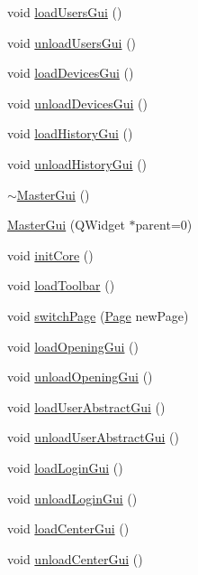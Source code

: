 \begin{DoxyCompactItemize}
void \hyperlink{class_master_gui_a1f18335831f755fa60cc7b2dfbb5f6f6}{load\-Users\-Gui} ()
\item 
void \hyperlink{class_master_gui_af822ec52a33f23f476684714aacd9a4c}{unload\-Users\-Gui} ()
\item 
void \hyperlink{class_master_gui_a9477c85af4420ec5c8d0c5ceeb4df9de}{load\-Devices\-Gui} ()
\item 
void \hyperlink{class_master_gui_abeb5b8861736263521757754dff9d5d9}{unload\-Devices\-Gui} ()
\item 
void \hyperlink{class_master_gui_aae738557e6153a8584468f8af3a5f2d8}{load\-History\-Gui} ()
\item 
void \hyperlink{class_master_gui_a0e0b8c7b714b89df916742664f7c338b}{unload\-History\-Gui} ()
\item 
\hyperlink{class_master_gui_a4eeae08177c54aba4aad160fc1c5efc6}{$\sim$\-Master\-Gui} ()
\item 
\hyperlink{class_master_gui_a661a3bdba67b40b286cc5d03f102a5fa}{Master\-Gui} (Q\-Widget $\ast$parent=0)
\item 
void \hyperlink{class_master_gui_a7f49d299b2139b827b29e7090c007b93}{init\-Core} ()
\item 
void \hyperlink{class_master_gui_acbb009f39bcb1ccc3829cbb1849887f7}{load\-Toolbar} ()
\item 
void \hyperlink{class_master_gui_a72a87c03cd2c7be58098e5c0902a43a2}{switch\-Page} (\hyperlink{class_master_gui_af69d22eb6d94d0c4f1291814e56f3d9f}{Page} new\-Page)
\item 
void \hyperlink{class_master_gui_ad7eb9322569582cd288da7212c89d2cc}{load\-Opening\-Gui} ()
\item 
void \hyperlink{class_master_gui_aa5276df266adf8b4b58edfb9b3df24e3}{unload\-Opening\-Gui} ()
\item 
void \hyperlink{class_master_gui_a918f12800f13f7c582a84e9d0a407e89}{load\-User\-Abstract\-Gui} ()
\item 
void \hyperlink{class_master_gui_a52a6841a6cf39acea335a89823af0380}{unload\-User\-Abstract\-Gui} ()
\item 
void \hyperlink{class_master_gui_aa66838cb8411174f17ad6022bb6da0a3}{load\-Login\-Gui} ()
\item 
void \hyperlink{class_master_gui_ab944aa39cdd748b94d1d96da952b85bb}{unload\-Login\-Gui} ()
\item 
void \hyperlink{class_master_gui_aa0fa6cf571cab286c77d16dd904e5d7b}{load\-Center\-Gui} ()
\item 
void \hyperlink{class_master_gui_a98fe5e5c3faef0cc42c68bb3acc4ae40}{unload\-Center\-Gui} ()

\end{DoxyCompactItemize}

